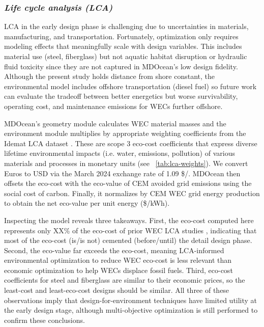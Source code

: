 \documentclass[10pt,twoside]{article}
\begin{document}
\subsubsection{\textit{Life cycle analysis (LCA)}}
LCA in the early design phase is challenging due to uncertainties in materials, manufacturing, and transportation.
Fortunately, optimization only requires modeling effects that meaningfully scale with design variables.
This includes material use (steel, fiberglass) but not aquatic habitat disruption or hydraulic fluid toxicity since they are not captured in MDOcean's low design fidelity.
Although the present study holds distance from shore constant, the environmental model includes offshore transportation (diesel fuel) so future work can evaluate the tradeoff between better energetics but worse survivability, operating cost, and maintenance emissions for WECs further offshore.

MDOcean's geometry module calculates WEC material masses and the environment module multiplies by appropriate weighting coefficients from the Idemat LCA dataset \cite{van_den_herik_idemat_2024}. These are scope 3 eco-cost coefficients \cite{vogtlander_lca-based_2010} that express diverse lifetime environmental impacts (i.e. water, emissions, pollution) of various materials and processes in monetary units (see \tableautorefname~\ref{tab:lca-weights}).
We convert Euros to USD via the March 2024 exchange rate of 1.09 \$/\texteuro.
MDOcean then offsets the eco-cost with the eco-value of CEM avoided grid emissions using the social cost of carbon. Finally, it normalizes by CEM WEC grid energy production to obtain the net eco-value per unit energy (\$/kWh).

Inspecting the model reveals three takeaways.
First, the eco-cost computed here represents only XX\% of the eco-cost of prior WEC LCA studies \cite{LCA}, indicating that most of the eco-cost (is/is not) cemented (before/until) the detail design phase.
Second, the eco-value far exceeds the eco-cost, meaning LCA-informed environmental optimization to reduce WEC eco-cost is less relevant than economic optimization to help WECs displace fossil fuels.
Third, eco-cost coefficients for steel and fiberglass are similar to their economic prices, so the least-cost and least-eco-cost designs should be similar.
All three of these observations imply that design-for-environment techniques have limited utility at the early design stage, although multi-objective optimization is still performed to confirm these conclusions.
\end{document}
